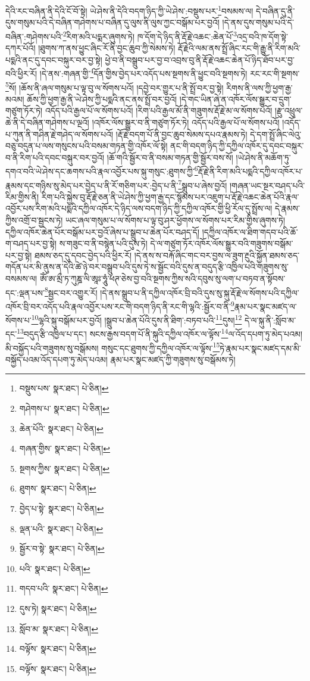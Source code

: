 དེའི་རང་བཞིན་ནི་དེའི་ངོ་བོ་སྟེ། ཡེ་ཤེས་ནི་དེའི་བདག་ཉིད་ཀྱི་ཡེ་ཤེས་:བསྡུས་པར་\footnote{བསྡུས་པས་  སྣར་ཐང་།  པེ་ཅིན། }བསམས་ལ། དེ་བཞིན་དུ་ནི་དུས་གསུམ་པའི་དེ་བཞིན་གཤེགས་པ་བཞིན་དུ་ལུས་ནི་ལུས་ཀྱང་བསྒོམ་པར་བྱའོ། །དེ་ནས་དུས་གསུམ་པའི་དེ་བཞིན་:གཤེགས་པའི་\footnote{གཤེགས་པ་  སྣར་ཐང་།  པེ་ཅིན། }རིག་མའི་པདྨར་ཞུགས་ཏེ། ཁ་དོག་དེ་ཉིད་ནི་རྡོ་རྗེ་འཆང་:ཆེན་པོ་\footnote{ཆེན་པོའི་  སྣར་ཐང་།  པེ་ཅིན། }འདྲ་བའི་ཁ་དོག་སྟེ་དཀར་པོའོ། །ཐུགས་ཀ་ནས་ཕྱུང་ཞིང་རོ་ནི་བྱང་ཆུབ་ཀྱི་སེམས་ཏེ། རྡོ་རྗེའི་ལམ་ནས་སྤྲོ་ཞིང་རང་གི་རྒྱུ་ནི་རིག་མའི་པདྨའི་ནང་དུ་དབང་བསྐུར་བར་བྱ་སྟེ། ཕྱེ་བ་ནི་བསྒྲུབ་པར་བྱ་བ་འབྲས་བུ་ནི་རྡོ་རྗེ་འཆང་ཆེན་པོ་ཉིད་ཐོབ་པར་བྱ་བའི་ཕྱིར་རོ། །དེ་ནས་:གཞན་གྱི་\footnote{གཞན་གྱིས་  སྣར་ཐང་།  པེ་ཅིན། }དོན་གྱིས་བྱེད་པར་འདོད་པས་སྔགས་ནི་ཕྱུང་བའི་སྔགས་ཏེ། རང་རང་གི་སྔགས་\footnote{སྔགས་ཀྱིས་  སྣར་ཐང་།  པེ་ཅིན། }སོ། །ཆོས་ནི་ཞལ་གསུམ་པ་ལྟ་བུ་ལ་སོགས་པའོ། །དབྱེ་བར་གྱུར་པ་ནི་སྤྲོ་བར་བྱ་སྟེ། རིགས་ནི་ལས་ཀྱི་ཕྱག་རྒྱ་མའམ། ཆོས་ཀྱི་ཕྱག་རྒྱ་ནི་ཡེ་ཤེས་ཀྱི་པདྨའི་ནང་ནས་སྤྲོ་བར་བྱའོ། །དེ་གང་ཡིན་ཞེ་ན་འཁོར་ལོས་སྒྱུར་བ་དྲུག་གཙུག་ཏོར་ཏེ། འདོད་པའི་རྒྱལ་པོ་ལ་སོགས་པའོ། །རིག་པའི་རྒྱལ་མོ་ནི་གཟུགས་རྡོ་རྗེ་མ་ལ་སོགས་པའོ། །རྫུ་འཕྲུལ་ཆེ་ནི་དེ་བཞིན་གཤེགས་པ་ལྔའོ། །འཁོར་ལོས་སྒྱུར་བ་ནི་གཙུག་ཏོར་ཏེ། འདོད་པའི་རྒྱལ་པོ་ལ་སོགས་པའོ། །འདོད་པ་ཀུན་ནི་གཤིན་རྗེ་གཤེད་ལ་སོགས་པའོ། །རྡོ་རྗེ་བདག་པོ་ནི་བྱང་ཆུབ་སེམས་དཔའ་རྣམས་ཏེ། དེ་དག་སྤྲོ་ཞིང་ལེའུ་བཅུ་བདུན་པ་ལས་གསུངས་པའི་བསམ་གཏན་གྱི་འཁོར་ལོ་སྟེ། ནང་གི་བདག་ཉིད་ཀྱི་དཀྱིལ་འཁོར་དུ་དབང་བསྐུར་བ་ནི་རིག་པའི་དབང་བསྐུར་བར་བྱའོ། །ཆོ་གའི་སྦྱོར་བ་ནི་བསམ་གཏན་གྱི་སྦྱོར་བས་སོ། །ཡེ་ཤེས་ནི་མཆོག་ཏུ་དགའ་བའི་ཡེ་ཤེས་དང་ཆགས་པའི་རྣལ་འབྱོར་པས་སྐུ་གསུང་:ཐུགས་ཀྱི་\footnote{ཐུགས་  སྣར་ཐང་།  པེ་ཅིན། }རྡོ་རྗེ་ནི་རིག་མའི་པདྨའི་དཀྱིལ་འཁོར་པ་རྣམས་དང་གཉིས་སུ་མེད་པར་བྱེད་པ་ནི་རོ་གཅིག་པར་:བྱེད་པ་ནི་\footnote{བྱེད་པ་སྟེ་  སྣར་ཐང་།  པེ་ཅིན། }སྒྲུབ་པ་ཞེས་བྱའོ། །གཞན་ཡང་སྔར་བཤད་པའི་རིམ་གྱིས་ནི། རིག་པའི་སྐྱེས་བུ་རྡོ་རྗེ་ཅན་ནི་ཡེ་ཤེས་ཀྱི་ཕྱག་རྒྱ་དང་སྙོམས་པར་འཇུག་པ་རྡོ་རྗེ་འཆང་ཆེན་པོའི་རྣལ་འབྱོར་པས་རིག་མའི་པདྨའི་དཀྱིལ་འཁོར་དེ་ཉིད་ལས་བདག་ཉིད་ཀྱི་དཀྱིལ་འཁོར་གྱི་ཕྱི་རོལ་དུ་སྤྲོས་ལ། དེ་རྣམས་ཀྱིས་འགྲོ་བ་སྦྱངས་ཏེ། ཡང་ཞལ་གསུམ་པ་ལ་སོགས་པ་ལྟ་བུ་ཤར་ཕྱོགས་ལ་སོགས་པར་རིམ་གྱིས་ཞུགས་ཏེ། དཀྱིལ་འཁོར་ཆེན་པོར་བསྒོམ་པར་བྱའོ་ཞེས་པ་སྒྲུབ་པ་ཆེན་པོར་བཤད་དོ། །དཀྱིལ་འཁོར་ལ་ཐིག་གདབ་པའི་ཆོ་ག་བཤད་པར་བྱ་སྟེ། ས་གཟུང་བ་ནི་བསྙེན་པའི་དུས་ཏེ། དེ་ལ་གཙུག་ཏོར་འཁོར་ལོས་སྒྱུར་བའི་གཟུགས་བསྒོམ་པར་བྱ་སྟེ། ཐམས་ཅད་དུ་དབང་བྱེད་པའི་ཕྱིར་རོ། །དེ་ནས་ས་བརྐོ་ཞིང་གང་བར་བྱས་ལ་ཟུག་རྔུའི་སྐྱོན་ཐམས་ཅད་གདོན་པར་མི་ནུས་ན་དེའི་ཚེ་ཉེ་བར་བསྒྲུབ་པའི་དུས་ཏེ་ས་སྦྱོང་བའི་དུས་ན་བདུད་རྩི་འཁྱིལ་པའི་གཟུགས་སུ་བསམས་ལ། ཨོཾ་ཨ་མྲྀ་ཏ་ཀུཎྜ་ལི་ཨཱཿ་ཧཱུཾ་ཕཊ་ཅེས་བྱ་བའི་སྔགས་ཀྱིས་སའི་དབུས་སུ་ལག་པ་བཏབ་ན་སྟོབས་དང་:ལྡན་པས་\footnote{ལྡན་པའི་  སྣར་ཐང་།  པེ་ཅིན། }སྦྱང་བར་འགྱུར་རོ། །དེ་ནས་སྒྲུབ་པ་ནི་དཀྱིལ་འཁོར་བྲི་བའི་དུས་སུ་སྐུ་རྡོ་རྗེ་ལ་སོགས་པའི་དཀྱིལ་འཁོར་བྲི་བར་འདོད་པའི་རྣལ་འབྱོར་པས་རང་གི་བདག་ཉིད་ནི་རང་གི་ལྷའི་:སྦྱོར་བ་ནི་\footnote{སྦྱོར་བ་སྟེ་  སྣར་ཐང་།  པེ་ཅིན། }རྣམ་པར་སྣང་མཛད་ལ་སོགས་པ་\footnote{པའི་  སྣར་ཐང་།  པེ་ཅིན། }ལྷའི་སྐུ་བསྒོམ་པར་བྱའོ། །སྒྲུབ་པ་ཆེན་པོའི་དུས་ནི་ཐིག་:བཏབ་པའི་\footnote{གདབ་པའི་  སྣར་ཐང་།  པེ་ཅིན། }དུས།\footnote{དུས་ཏེ།  སྣར་ཐང་།  པེ་ཅིན། } དེ་ལ་སྐུ་ནི་:སློབ་མ་དང་\footnote{སློབ་མ་  སྣར་ཐང་།  པེ་ཅིན། }བདུད་རྩི་འཁྱིལ་པ་དང་། སངས་རྒྱས་བདག་པོ་ནི་སྐུའི་དཀྱིལ་འཁོར་ལ་ལྟོས་\footnote{བལྟོས་  སྣར་ཐང་།  པེ་ཅིན། }ལ་འོད་དཔག་ཏུ་མེད་པའམ། མི་བསྐྱོད་པའི་གཟུགས་སུ་བསྒོམས། གསུང་དང་ཐུགས་ཀྱི་དཀྱིལ་འཁོར་ལ་ལྟོས་\footnote{བལྟོས་  སྣར་ཐང་།  པེ་ཅིན། }ཏེ་རྣམ་པར་སྣང་མཛད་དམ་མི་བསྐྱོད་པའམ་འོད་དཔག་ཏུ་མེད་པའམ། རྣམ་པར་སྣང་མཛད་ཀྱི་གཟུགས་སུ་བསྒོམས་ཏེ། 